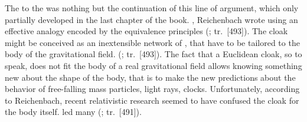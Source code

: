 \documentclass[draft]{article}
\newcommand{\PRZL}{\citetitle{Reichenbach1928}\xspace}
\renewcommand{\rzlap}[2]{(\cite[#1]{Reichenbach1928}; tr.\ [#2])\xspace}
\begin{document}

The \Ap to the \PRZL was nothing but the continuation of this line of argument, which only partially developed in the last chapter of the book. , Reichenbach wrote using an effective analogy  encoded by the equivalence principles \rzlap{354}{493}. The cloak might be conceived as an inextensible network of \rac, that have to be tailored to the body of the gravitational field.  \rzlap{354}{493}. The fact that a Euclidean cloak, so to speak, does not fit the body of a real gravitational field allows knowing something new about the shape of the body, that is to make the new predictions about the behavior of free-falling mass particles, light rays, clocks\etc. Unfortunately, according to Reichenbach, recent relativistic research seemed to have confused the cloak for the body itself.  led many  \rzlap{352}{491}. 
\end{document}
